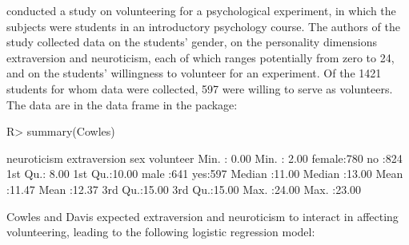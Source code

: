 \documentclass[article]{jss}
\begin{document}
\citet{CowlesDavis87} conducted a study on volunteering for a
psychological experiment, in which the subjects were students in an
introductory psychology course. The authors of the study collected
data on the students' gender, on the personality dimensions
extraversion and neuroticism, each of which ranges potentially from
zero to 24, and on the students' willingness to volunteer for an
experiment. Of the 1421 students for whom data were collected, 597
were willing to serve as volunteers. The data are in the 
data frame in the  package:
%
\begin{Schunk}
\begin{Sinput}
R> summary(Cowles)
\end{Sinput}
\begin{Soutput}
  neuroticism     extraversion       sex      volunteer
 Min.   : 0.00   Min.   : 2.00   female:780   no :824  
 1st Qu.: 8.00   1st Qu.:10.00   male  :641   yes:597  
 Median :11.00   Median :13.00                         
 Mean   :11.47   Mean   :12.37                         
 3rd Qu.:15.00   3rd Qu.:15.00                         
 Max.   :24.00   Max.   :23.00                         
\end{Soutput}
\end{Schunk}
%
Cowles and Davis expected extraversion and neuroticism to interact in affecting volunteering, leading to the following logistic regression model:
%
\end{document}
